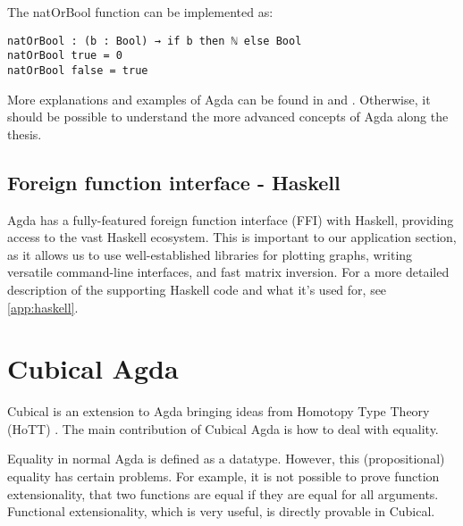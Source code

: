 The natOrBool function can be implemented as:
\begin{verbatim}
natOrBool : (b : Bool) → if b then ℕ else Bool
natOrBool true = 0
natOrBool false = true
\end{verbatim}

More explanations and examples of Agda can be found in \cite{agdaWebsite} and \cite{DependentTypesAtWork}. Otherwise, it should be possible to understand the more advanced concepts of Agda along the thesis.

\subsection{Foreign function interface - Haskell}
Agda has a fully-featured foreign function interface (FFI) with Haskell, providing access to the vast Haskell ecosystem. This is important to our application section, as it allows us to use well-established libraries for plotting graphs, writing versatile command-line interfaces, and fast matrix inversion. For a more detailed description of the supporting Haskell code and what it's used for, see \ref{app:haskell}.





\section{Cubical Agda}
Cubical \cite{cubicalAgdaDocs} is an extension to Agda bringing ideas from Homotopy Type Theory (HoTT) \cite{hottBook}. The main contribution of Cubical Agda is how to deal with equality.

Equality in normal Agda is defined as a datatype. However, this (propositional) equality has certain problems. For example, it is not possible to prove function extensionality, that two functions are equal if they are equal for all arguments. Functional extensionality, which is very useful, is directly provable in Cubical.

